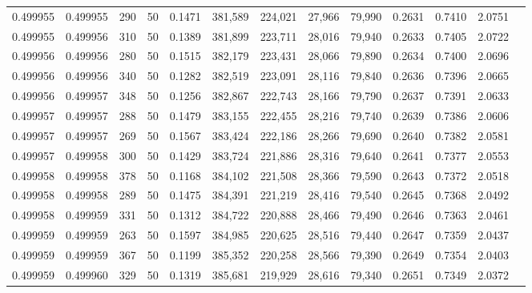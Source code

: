 \begin{tabular}{rrrrrrrrrrrrr}
0.499955 & 0.499955 &   290 &  50 &                                     0.1471 & 381,589 & 224,021 &  27,966 &  79,990 & 0.2631 & 0.7410 & 2.0751 \\
0.499955 & 0.499956 &   310 &  50 &                                     0.1389 & 381,899 & 223,711 &  28,016 &  79,940 & 0.2633 & 0.7405 & 2.0722 \\
0.499956 & 0.499956 &   280 &  50 &                                     0.1515 & 382,179 & 223,431 &  28,066 &  79,890 & 0.2634 & 0.7400 & 2.0696 \\
0.499956 & 0.499956 &   340 &  50 &                                     0.1282 & 382,519 & 223,091 &  28,116 &  79,840 & 0.2636 & 0.7396 & 2.0665 \\
0.499956 & 0.499957 &   348 &  50 &                                     0.1256 & 382,867 & 222,743 &  28,166 &  79,790 & 0.2637 & 0.7391 & 2.0633 \\
0.499957 & 0.499957 &   288 &  50 &                                     0.1479 & 383,155 & 222,455 &  28,216 &  79,740 & 0.2639 & 0.7386 & 2.0606 \\
0.499957 & 0.499957 &   269 &  50 &                                     0.1567 & 383,424 & 222,186 &  28,266 &  79,690 & 0.2640 & 0.7382 & 2.0581 \\
0.499957 & 0.499958 &   300 &  50 &                                     0.1429 & 383,724 & 221,886 &  28,316 &  79,640 & 0.2641 & 0.7377 & 2.0553 \\
0.499958 & 0.499958 &   378 &  50 &                                     0.1168 & 384,102 & 221,508 &  28,366 &  79,590 & 0.2643 & 0.7372 & 2.0518 \\
0.499958 & 0.499958 &   289 &  50 &                                     0.1475 & 384,391 & 221,219 &  28,416 &  79,540 & 0.2645 & 0.7368 & 2.0492 \\
0.499958 & 0.499959 &   331 &  50 &                                     0.1312 & 384,722 & 220,888 &  28,466 &  79,490 & 0.2646 & 0.7363 & 2.0461 \\
0.499959 & 0.499959 &   263 &  50 &                                     0.1597 & 384,985 & 220,625 &  28,516 &  79,440 & 0.2647 & 0.7359 & 2.0437 \\
0.499959 & 0.499959 &   367 &  50 &                                     0.1199 & 385,352 & 220,258 &  28,566 &  79,390 & 0.2649 & 0.7354 & 2.0403 \\
0.499959 & 0.499960 &   329 &  50 &                                     0.1319 & 385,681 & 219,929 &  28,616 &  79,340 & 0.2651 & 0.7349 & 2.0372 \\

\end{tabular}
